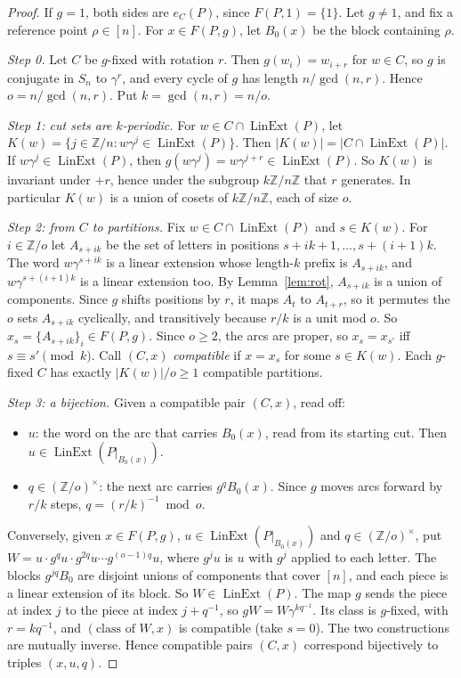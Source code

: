 \documentclass[11pt]{article}
\theoremstyle{definition}
\theoremstyle{remark}
\newcommand{\Lin}{\operatorname{LinExt}}
\begin{document}
\begin{proof}
If $g=1$, both sides are $e_C(P)$, since $F(P,1)=\{\hat1\}$. Let $g\ne1$, and
fix a reference point $\rho\in[n]$. For $x\in F(P,g)$, let $B_0(x)$ be the
block containing $\rho$.

\emph{Step 0.} Let $C$ be $g$-fixed with rotation $r$. Then $g(w_i)=w_{i+r}$
for $w\in C$, so $g$ is conjugate in $S_n$ to $\gamma^r$, and every cycle of
$g$ has length $n/\gcd(n,r)$. Hence $o=n/\gcd(n,r)$. Put $k=\gcd(n,r)=n/o$.

\emph{Step 1: cut sets are $k$-periodic.} For $w\in C\cap\Lin(P)$, let
$K(w)=\{j\in\mathbb Z/n:w\gamma^j\in\Lin(P)\}$. Then $|K(w)|=|C\cap\Lin(P)|$.
If $w\gamma^j\in\Lin(P)$, then $g(w\gamma^j)=w\gamma^{j+r}\in\Lin(P)$. So
$K(w)$ is invariant under $+r$, hence under the subgroup $k\mathbb Z/n\mathbb Z$
that $r$ generates. In particular $K(w)$ is a union of cosets of
$k\mathbb Z/n\mathbb Z$, each of size $o$.

\emph{Step 2: from $C$ to partitions.} Fix $w\in C\cap\Lin(P)$ and
$s\in K(w)$. For $i\in\mathbb Z/o$ let $A_{s+ik}$ be the set of letters in
positions $s+ik+1,\dots,s+(i+1)k$. The word $w\gamma^{s+ik}$ is a linear
extension whose length-$k$ prefix is $A_{s+ik}$, and $w\gamma^{s+(i+1)k}$ is
a linear extension too. By Lemma~\ref{lem:rot}, $A_{s+ik}$ is a union of
components. Since $g$ shifts positions by $r$, it maps $A_t$ to $A_{t+r}$, so
it permutes the $o$ sets $A_{s+ik}$ cyclically, and transitively because
$r/k$ is a unit mod $o$. So $x_s=\{A_{s+ik}\}_i\in F(P,g)$. Since $o\ge2$, the
arcs are proper, so $x_s=x_{s'}$ iff $s\equiv s'\pmod k$. Call
$(C,x)$ \emph{compatible} if $x=x_s$ for some $s\in K(w)$. Each $g$-fixed
$C$ has exactly $|K(w)|/o\ge1$ compatible partitions.

\emph{Step 3: a bijection.} Given a compatible pair $(C,x)$, read off:
\begin{itemize}[nosep]
\item $u$: the word on the arc that carries $B_0(x)$, read from its starting
  cut. Then $u\in\Lin(P|_{B_0(x)})$.
\item $q\in(\mathbb Z/o)^\times$: the next arc carries $g^qB_0(x)$. Since $g$
  moves arcs forward by $r/k$ steps, $q=(r/k)^{-1}\bmod o$.
\end{itemize}
Conversely, given $x\in F(P,g)$, $u\in\Lin(P|_{B_0(x)})$ and
$q\in(\mathbb Z/o)^\times$, put
$W=u\cdot g^qu\cdot g^{2q}u\cdots g^{(o-1)q}u$, where $g^ju$ is $u$ with $g^j$
applied to each letter. The blocks $g^{jq}B_0$ are disjoint unions of
components that cover $[n]$, and each piece is a linear extension of its
block. So $W\in\Lin(P)$. The map $g$ sends the piece at index $j$ to the
piece at index $j+q^{-1}$, so $gW=W\gamma^{kq^{-1}}$. Its class is
$g$-fixed, with $r=kq^{-1}$, and $(\text{class of }W,x)$ is compatible (take
$s=0$). The two constructions are mutually inverse. Hence compatible pairs
$(C,x)$ correspond bijectively to triples $(x,u,q)$.


\end{proof}
\end{document}
